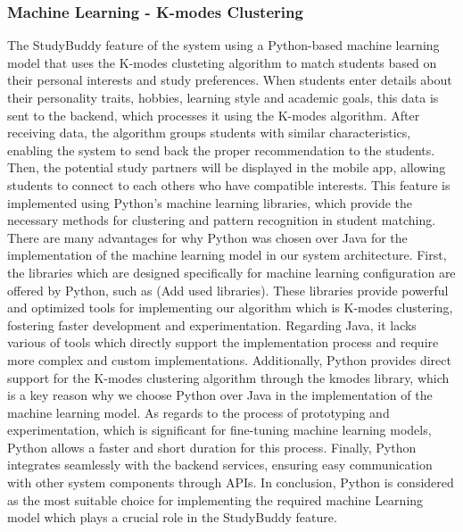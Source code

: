 \documentclass[12pt]{article}
\begin{document}
\pagebreak

\pagebreak

\subsubsection{Machine Learning - K-modes Clustering}
The StudyBuddy feature of the system using a Python-based machine learning model that uses the K-modes clusteting algorithm to match students based on their personal interests and study preferences.
When students enter details about their personality traits, hobbies, learning style and academic goals, this data is sent to the backend, which processes it using the K-modes algorithm.
After receiving data, the algorithm groups students with similar characteristics, enabling the system to send back the proper recommendation to the students.
Then, the potential study partners will be displayed in the mobile app, allowing students to connect to each others who have compatible interests.
This feature is implemented using Python's machine learning libraries, which provide the necessary methods for clustering and pattern recognition in student matching. \\

There are many advantages for why Python was chosen over Java for the implementation of the machine learning model in our system architecture. First, the libraries which are designed specifically for machine learning configuration are offered by Python, such as (Add used libraries). These libraries provide powerful and optimized tools for implementing our algorithm which is K-modes clustering, fostering faster development and experimentation.
Regarding Java, it lacks various of tools which directly support the implementation process and require more complex and custom implementations. Additionally, Python provides direct support for the K-modes clustering algorithm through the kmodes library, which is a key reason why we choose Python over Java in the implementation of the machine learning model.
As regards to the process of prototyping and experimentation, which is significant for fine-tuning machine learning models, Python allows a faster and short duration for this process. Finally, Python integrates seamlessly with the backend services, ensuring easy communication with other system components through APIs.
In conclusion, Python is considered as the most suitable choice for implementing the required machine Learning model which plays a crucial role in the StudyBuddy feature.
\end{document}
